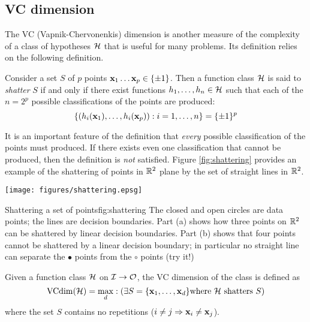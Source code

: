 \subsection{VC dimension}
\label{acr:vcdim}
\label{sec:vcdim}

The VC (Vapnik-Chervonenkis) dimension is another measure of the
complexity of a class of hypotheses $\mathcal{H}$ that is useful for many
problems.  Its definition relies on the following definition.

\begin{definition}[Shattering]
Consider a set $S$ of $p$ points $\mathbf{x}_1 \ldots \mathbf{x}_p \in \{\pm 1\}$.
Then a function class $\mathcal{H}$ is said to \emph{shatter} $S$ if and
only if there exist functions $h_1, \ldots, h_n \in \mathcal{H}$ such that
each of the $n = 2^p$ possible classifications of the points are
produced: 
%
\begin{equation}
\left\{ (h_i(\mathbf{x}_1), \ldots, h_i(\mathbf{x}_p)): i=1, \ldots, n \right\}
= \{\pm 1\}^p
\end{equation}
%
\end{definition}

It is an important feature of the definition that \emph{every}
possible classification of the points must produced.  If there exists
even one classification that cannot be produced, then the definition
is \emph{not} satisfied.  Figure \ref{fig:shattering} provides an
example of the shattering of points in $\mathbb{R}^2$ plane by the set of
straight lines in $\mathbb{R}^2$. 

\begin{linefigure}
\begin{center}
\texttt{[image: figures/shattering.epsg]}
\end{center}
\begin{capt}{Shattering a set of points}{fig:shattering}
The closed and open circles are data points; the lines are decision
boundaries.  Part (a) shows how three points on $\mathbb{R}^2$ can be
shattered by linear decision boundaries.  Part (b) shows that four
points cannot be shattered by a linear decision boundary; in
particular no straight line can separate the $\bullet$ points from the
$\circ$ points (try it!)
\end{capt}
\end{linefigure}

\begin{definition}[VC dimension]
\label{thm:vcdim bound}
Given a function class $\mathcal{H}$ on $\mathcal{I} \rightarrow \mathcal{O}$, the VC
dimension of the class is defined as
%
\begin{equation}
\mathrm{VCdim}(\mathcal{H}) = \max_{d} : ( \exists S = \{\mathbf{x}_1, \ldots, \mathbf{x}_d\} 
\mbox{\rm where $\mathcal{H}$ shatters $S$})
\end{equation}
%
where the set $S$ contains no repetitions ($i \neq j \Rightarrow
\mathbf{x}_i \neq \mathbf{x}_j$).
\end{definition}

